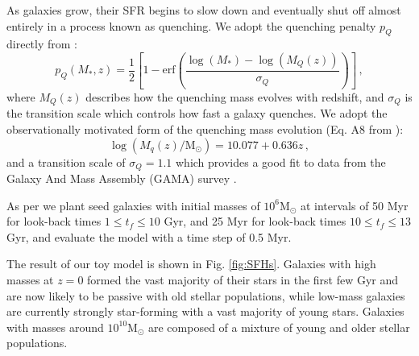 \documentclass[fleqn,usenatbib]{mnras}
\begin{document}
As galaxies grow, their SFR begins to slow down and eventually shut off almost entirely in a process known as quenching. We adopt the quenching penalty $p_Q$ directly from \citet{Childress2014}:
\begin{equation}
    p_Q(M_*,z) = \frac{1}{2}\left[1 - \mathrm{erf}\left(\frac{\log(M_*) - \log(M_Q(z))}{\sigma_Q}\right)\right]\,,
    \label{eq:pq}
\end{equation}
where $M_Q(z)$ describes how the quenching mass evolves with redshift, and $\sigma_Q$ is the transition scale which controls how fast a galaxy quenches. We adopt the observationally motivated form of the quenching mass evolution (Eq. A8 from \citealt{Childress2014}):
\begin{equation}
    \log(M_q(z)/\mathrm{M}_{\odot}) = 10.077 + 0.636z \,, 
    \label{eq:mq}
\end{equation}
and a transition scale of $\sigma_Q = 1.1$ which provides a good fit to data from the Galaxy And Mass Assembly (GAMA) survey \citep{Baldry2012}.

As per \citet{Childress2014} we plant seed galaxies with initial masses of $10^6 \mathrm{M}_{\odot}$ at intervals of 50 Myr for look-back times $1 \leq t_f \leq 10$ Gyr, and 25 Myr for look-back times $10 \leq t_f \leq 13$ Gyr, and evaluate the model with a time step of 0.5 Myr.

The result of our toy model is shown in Fig. \ref{fig:SFHs}. Galaxies with high masses at $z=0$ formed the vast majority of their stars in the first few Gyr and are now likely to be passive with old stellar populations, while low-mass galaxies are currently strongly star-forming with a vast majority of young stars. Galaxies with masses around $10^{10} \mathrm{M}_{\odot}$ are composed of a mixture of young and older stellar populations.
\end{document}
